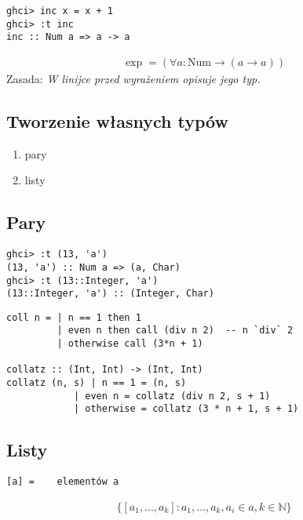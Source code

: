 \documentclass{article}
\begin{document}
\begin{verbatim}
ghci> inc x = x + 1
ghci> :t inc
inc :: Num a => a -> a
\end{verbatim}

\begin{align}
    \exp = (\forall a: \text{Num} \rightarrow (a\rightarrow a))    
\end{align}
Zasada: \textit{W linijce przed wyrażeniem opisuje jego typ.}

\subsection{Tworzenie własnych typów}

\begin{enumerate}
    \item pary
    \item listy
\end{enumerate}

\subsection{Pary}

\begin{verbatim}
ghci> :t (13, 'a')
(13, 'a') :: Num a => (a, Char)
ghci> :t (13::Integer, 'a')
(13::Integer, 'a') :: (Integer, Char)
\end{verbatim}

\begin{verbatim}
coll n = | n == 1 then 1
         | even n then call (div n 2)  -- n `div` 2
         | otherwise call (3*n + 1)

collatz :: (Int, Int) -> (Int, Int)
collatz (n, s) | n == 1 = (n, s)
            | even n = collatz (div n 2, s + 1)
            | otherwise = collatz (3 * n + 1, s + 1)
\end{verbatim}

\subsection{Listy}

\begin{verbatim}
[a] =    elementów a
\end{verbatim}

\begin{align}
    \{[a_1,\dots,a_k]: a_1,\dots,a_k, a_i\in a, k\in \mathbb{N}\}
\end{align}
\end{document}
